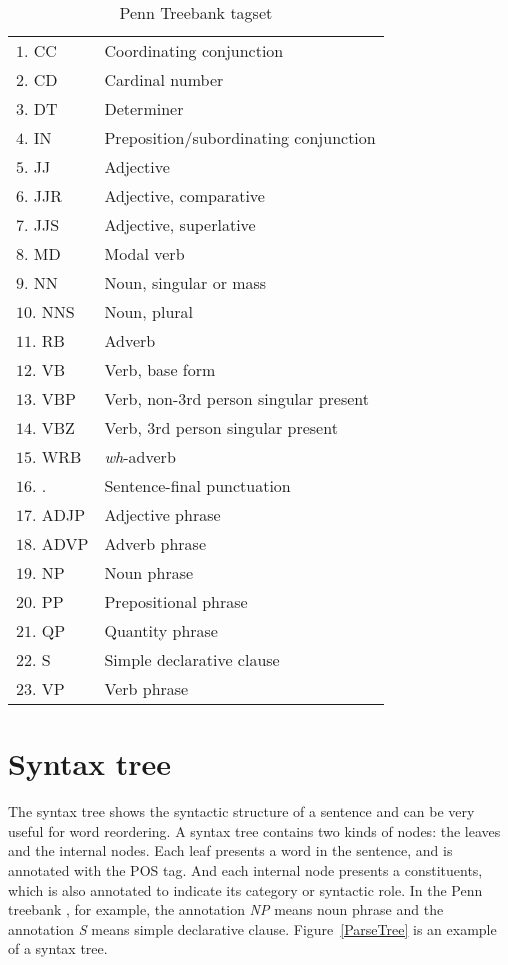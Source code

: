 \begin{table}
\centering
\begin{tabular}{|p{4.5cm}l|}
\hline
$1$. \hphantom{1}CC &  Coordinating conjunction\\
$2$.  \hphantom{1}CD &  Cardinal number\\
$3$. \hphantom{1}DT &  Determiner\\
$4$. \hphantom{1}IN &  Preposition/subordinating conjunction\\
$5$. \hphantom{1}JJ &  Adjective\\
$6$. \hphantom{1}JJR &   Adjective, comparative\\
$7$. \hphantom{1}JJS &   Adjective, superlative\\
$8$. \hphantom{1} MD &  Modal verb\\
$9$. \hphantom{1} NN &  Noun, singular or mass\\
$10$. NNS &   Noun, plural\\
$11$. RB &  Adverb\\
$12$. VB &  Verb, base form\\
$13$. VBP &   Verb, non-3rd person singular present\\
$14$. VBZ &   Verb, 3rd person singular present\\
$15$. WRB &   \textit{wh}-adverb\\
$16$. . &   Sentence-final punctuation\\
$17$. ADJP &  Adjective phrase\\
$18$. ADVP &  Adverb phrase\\
$19$. NP &  Noun phrase\\
$20$. PP &  Prepositional phrase\\
$21$. QP &  Quantity phrase\\
$22$. S &  Simple declarative clause\\
$23$. VP &  Verb phrase \\ \hline
\end{tabular}
\caption{Penn Treebank tagset}
\label{ttags}
\end{table}
\label{ch:Foundations:sec:PosTag}

\section{Syntax tree}
\label{ch:Foundations:sec:SyntacticTree}

The syntax tree shows the syntactic structure of a sentence and can be very useful for word reordering. A syntax tree contains two kinds of nodes: the leaves and the internal nodes. Each leaf presents a word in the sentence, and is annotated with the POS tag. And each internal node presents a constituents, which is also annotated to indicate its category or syntactic role. In the Penn treebank \citep{penn, penn3}, for example, the annotation \emph{NP} means noun phrase and the annotation \emph{S} means simple declarative clause. Figure~\ref{ParseTree} is an example of a syntax tree.

